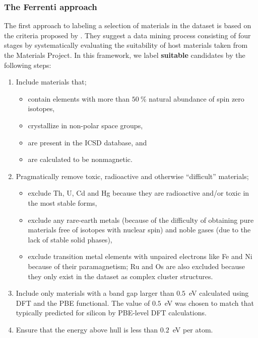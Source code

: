 \documentclass[superscriptaddress,unsortedaddress,
 amsmath,amssymb,
 aps,
]{revtex4-2}
\begin{document}
\subsubsection*{The Ferrenti approach}
The first approach to labeling a selection of materials in the dataset is based on the criteria proposed by \citeauthor{Ferrenti2020} \cite{Ferrenti2020}.
They suggest a data mining process consisting of four stages by systematically evaluating the suitability of host materials taken from the Materials Project. In this framework, we label \textbf{suitable} candidates by the following steps: 
\begin{enumerate}
    \item Include materials that;
    \begin{itemize}
        \item contain elements with more than $50 \ \%$ natural abundance of spin zero isotopes,
        \item crystallize in non-polar space groups,
        \item are present in the ICSD database, 
        and
        \item are calculated to be nonmagnetic. 
    \end{itemize}
    \item Pragmatically remove toxic, radioactive and otherwise ``difficult'' materials;
    \begin{itemize}
        \item exclude Th, U, Cd and Hg because they are radioactive and/or toxic in the most stable forms,
        \item exclude any rare-earth metals (because of the difficulty of obtaining pure materials free of isotopes with nuclear spin) and noble gases (due to the lack of stable solid phases),
        \item exclude transition metal elements with unpaired electrons like Fe and Ni because of their paramagnetism; Ru and Os are also excluded because they only exist in the dataset as complex cluster structures. 
    \end{itemize}
    \item Include only materials with a band gap larger than $0.5$~eV calculated using DFT and the PBE functional. The value of $0.5$~eV was chosen to match that typically predicted for silicon by PBE-level DFT calculations. 
    \item Ensure that the energy above hull is less than $0.2$~eV per atom.
\end{enumerate}
\end{document}
